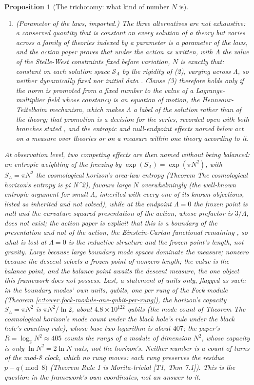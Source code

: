 \documentclass[11pt]{article}
\newtheorem{proposition}[theorem]{Proposition}
\theoremstyle{definition}
\theoremstyle{plain}
\begin{document}
\begin{proposition}[The trichotomy: what kind of number $N$ is]
\begin{enumerate}
\item \emph{(Parameter of the laws, imported.)} The three alternatives are not exhaustive: a conserved quantity that is constant on every solution of a theory but varies across a family of theories indexed by a parameter is a parameter of the laws, and the action paper proves that under the action as written, with $\Lambda$ the value of the Stelle-West constraints fixed before variation, $N$ is exactly that: constant on each solution space $\mathcal{S}_{\Lambda}$ by the rigidity of (2), varying across $\Lambda$, so neither dynamically fixed nor initial data \cite[Prop.~5.8]{ButlerT10}. Clause (3) therefore holds only if the norm is promoted from a fixed number to the value of a Lagrange-multiplier field whose constancy is an equation of motion, the Henneaux-Teitelboim mechanism, which makes $\Lambda$ a label of the solution rather than of the theory; that promotion is a decision for the series, recorded open with both branches stated \cite[Rem.~5.9]{ButlerT10}, and the entropic and null-endpoint effects named below act on a measure over theories or on a measure within one theory according to it.
\end{enumerate}
At observation level, two competing effects are then named without being balanced: an entropic weighting of the freezing by $\exp(S_{\Lambda}) = \exp(\pi N^{2})$, with $S_{\Lambda} = \pi N^{2}$ the cosmological horizon's area-law entropy (Theorem \emph{The cosmological horizon's entropy is pi N\^{}2}), favours large $N$ overwhelmingly (the well-known entropic argument for small $\Lambda$, inherited with every one of its known objections, listed as inherited and not solved), while at the endpoint $\Lambda = 0$ the frozen point is null and the curvature-squared presentation of the action, whose prefactor is $3/\Lambda$, does not exist; the action paper is explicit that this is a boundary of the presentation and not of the action, the Einstein-Cartan functional remaining \cite[Thm.~3.1, Rem.~3.2]{ButlerT10}, so what is lost at $\Lambda = 0$ is the reductive structure and the frozen point's length, not gravity. Large because large boundary mode spaces dominate the measure; nonzero because the descent selects a frozen point of nonzero length; the value is the balance point, and the balance point awaits the descent measure, the one object this framework does not possess. Last, a statement of units only, flagged as such: in the boundary modes' own units, qubits, one per rung of the Fock module (Theorem \ref{c:tower.fock-module-one-qubit-per-rung}), the horizon's capacity $S_{\Lambda} = \pi N^{2}$ is $\pi N^{2}/\ln 2$, about $4.8 \times 10^{122}$ qubits (the mode count of Theorem \emph{The cosmological horizon's mode count under the black hole's rule} under the black hole's counting rule), whose base-two logarithm is about $407$; the paper's $R = \log_{2} N^{2} \approx 405$ counts the rungs of a module of dimension $N^{2}$, whose capacity is only $\ln N^{2} = 2\ln N$ nats, not the horizon's. Neither number is a count of turns of the mod-8 clock, which no rung moves: each rung preserves the residue $p - q \pmod 8$ (Theorem \emph{Rule 1 is Morita-trivial} [T1, Thm 7.1]). This is the question in the framework's own coordinates, not an answer to it.

\end{proposition}
\end{document}
